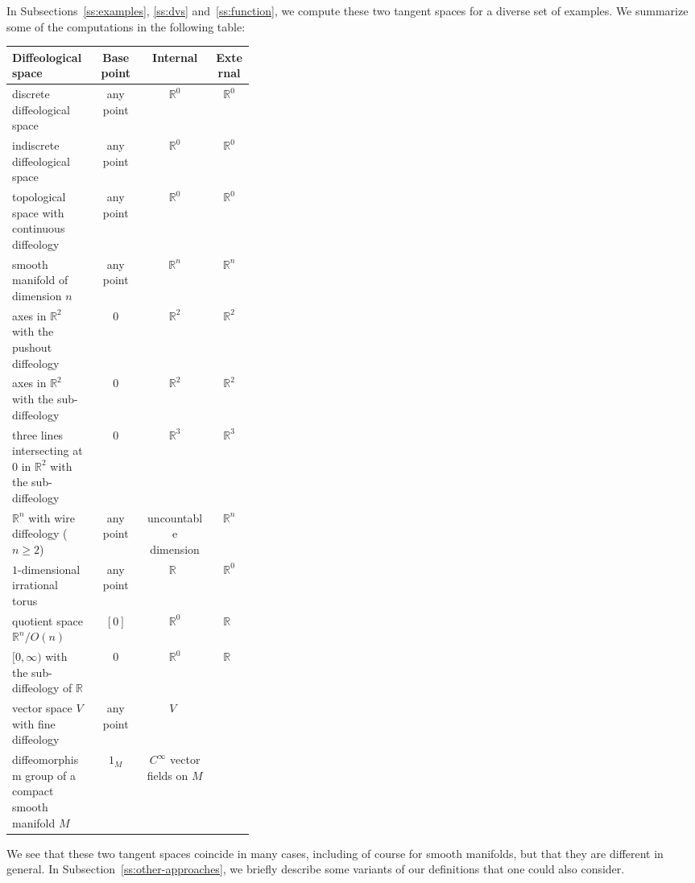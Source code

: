 \documentclass[12pt]{amsart}
\theoremstyle{remark}
\def \R{\mathbb{R}}
\begin{document}
In Subsections~\ref{ss:examples}, \ref{ss:dvs} and~\ref{ss:function}, we compute
these two tangent spaces for a diverse set of examples.
We summarize some of the computations in the following table:
\medskip
\begin{center}
\small
%
\setlength\extrarowheight{1pt}
%
\renewcommand{\arraystretch}{1.1}
\begin{tabular}{|p{0.35\linewidth}|c|c|c|}
\hline
\bf Diffeological space & \bf Base point & \bf Internal & \bf External \\
\hline
discrete diffeological space & any point & $\R^0$ & $\R^0$ \\
\hline
indiscrete diffeological space & any point & $\R^0$ & $\R^0$ \\
\hline
topological space with continuous diffeology & any point & $\R^0$ & $\R^0$ \\
\hline
smooth manifold of dimension $n$ & any point & $\R^n$ & $\R^n$ \\
\hline
axes in $\R^2$ with the pushout diffeology & 0 & $\R^2$ & $\R^2$ \\
%
%
%
\hline
axes in $\R^2$ with the sub-diffeology & 0 & $\R^2$ & $\R^2$ \\
%
%
\hline
three lines intersecting at $0$ in $\R^2$
with the sub-diffeology & 0 & $\R^3$ & $\R^3$ \\
\hline
$\R^n$ with wire diffeology ($n \geq 2$) & any point
& uncountable dimension & $\R^n$ \\
\hline
$1$-dimensional irrational torus & any point & $\R^{\phantom{1}}$ & $\R^0$ \\
\hline
quotient space $\R^n/O(n)$ & $[0]$ & $\R^0$ & $\R^{\phantom{1}}$ \\
\hline
$[0,\infty)$ with the sub-diffeology of $\R$ & $0$ & $\R^0$ & $\R^{\phantom{1}}$ \\
\hline
vector space $V$ with fine diffeology & any point & $V^{\phantom{1}}$ & \\
\hline
diffeomorphism group of a compact smooth manifold $M$ & $1_M$ & $C^\infty$ vector fields on $M$ & \\
\hline
\end{tabular}
\end{center}
\medskip
We see that these two tangent spaces coincide in many cases, including of
course for smooth manifolds, but that they are different in general.
In Subsection~\ref{ss:other-approaches}, we briefly describe some variants
of our definitions that one could also consider.
\end{document}
